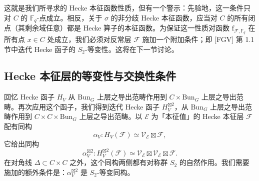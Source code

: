 \documentclass[11pt,a4paper]{article}
\newcommand{\Bun}{\mathrm{Bun}}
\begin{document}

这就是我们所寻求的 Hecke 本征函数性质，但有一个警示：先验地，这一条件只对 $C$ 的 $\mathbb{F}_q$-点成立。相反，关于 $\sigma$ 的非分歧 Hecke 本征函数，应当对 $C$ 的所有闭点（其剩余域任意）都是 Hecke 算子的本征函数。为保证这一性质对函数 $\mathrm{f}_{\mathcal{F},\mathbb{F}_q}$ 在所有点 $x\in C$ 处成立，我们必须对反常层 $\mathcal{F}$ 施加一个附加条件；即 [FGV] 第 1.1 节中迭代 Hecke 函子的 $S_2$-等变性。这将在下一节讨论。

\subsection{Hecke 本征层的等变性与交换性条件}

回忆 Hecke 函子 $H_V$ 从 $\Bun_G$ 上层之导出范畴作用到 $C\times \Bun_G$ 上层之导出范畴。再次应用这个函子，我们得到迭代 Hecke 函子 $H_V^{\boxtimes 2}$，从 $\Bun_G$ 上层之导出范畴作用到 $C\times C\times \Bun_G$ 上层之导出范畴。以 $\mathcal{E}$ 为「本征值」的 Hecke 本征层 $\mathcal{F}$ 配有同构
\[
\alpha_V : H_V(\mathcal{F}) \simeq \mathcal{V}_{\mathcal{E}} \boxtimes \mathcal{F},
\]
它给出同构
\[
\alpha_V^{\boxtimes 2} : H_V^{\boxtimes 2}(\mathcal{F}) \simeq \mathcal{V}_{\mathcal{E}} \boxtimes \mathcal{V}_{\mathcal{E}} \boxtimes \mathcal{F}.
\]
在对角线 $\Delta\subset C\times C$ 之外，这个同构两侧都有对称群 $S_2$ 的自然作用。我们需要施加的额外条件是：$\alpha_V^{\boxtimes 2}$ 是 $S_2$-等变同构。

\end{document}
